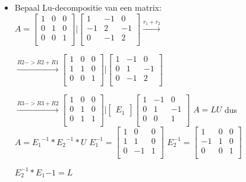 \documentclass{article}
\begin{document}
\begin{itemize}
\item Bepaal Lu-decompositie van een matrix:\newline
$A = \begin{bmatrix}
1 & 0 & 0\\
0 & 1 & 0\\
0 & 0 & 1\\
\end{bmatrix}
|
\begin{bmatrix}
1 & -1 & 0\\
-1 & 2 & -1\\
0 & -1 & 2\\
\end{bmatrix}\overset{r_1+r_2}{\longrightarrow} 
$

$\overset{R2 -> R2+R1}{\longrightarrow}\begin{bmatrix}
1 & 0 & 0\\
1 & 1 & 0\\
0 & 0 & 1\\
\end{bmatrix}
|
\begin{bmatrix}
1 & -1 & 0\\
0 & 1 & -1\\
0 & -1 & 2\\
\end{bmatrix} $


$\overset{R3 -> R3+R2}{\longrightarrow}\begin{bmatrix}
1 & 0 & 0\\
0 & 1 & 0\\
0 & 1 & 1\\
\end{bmatrix}
|
\begin{bmatrix}
E_1
\end{bmatrix}
\begin{bmatrix}
1 & -1 & 0\\
0 & 1 & -1\\
0 & 0 & 1\\
\end{bmatrix} $
\newline
$A =LU$ dus $A = {E_1}^{-1}*{E_2}^{-1}*U$
\newline
$E_1^{-1} = \begin{bmatrix}
1 & 0 & 0\\
1 & 1 & 0\\
0 & -1 & 1\\
\end{bmatrix}$
\newline
$E_2^{-1} = \begin{bmatrix}
1 & 0 & 0\\
-1 & 1 & 0\\
0 & 0 & 1\\
\end{bmatrix}$
\newline

$E_2^{-1}*E_1{-1} = L$
\end{itemize}
\end{document}
